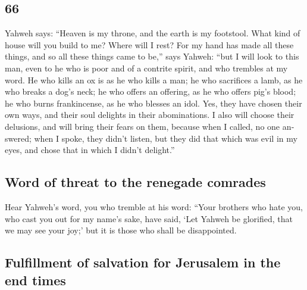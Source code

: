 \begin{paracol}{2}
\begin{otherlanguage}{english}
\hypertarget{section-131}{%
\section{66}\label{section-131}}

 Yahweh says: ``Heaven is my throne, and the earth is my
footstool. What kind of house will you build to me? Where will I rest?
 For my hand has made all these things, and so all these
things came to be,'' says Yahweh: ``but I will look to this man, even to
he who is poor and of a contrite spirit, and who trembles at my word.
 He who kills an ox is as he who kills a man; he who
sacrifices a lamb, as he who breaks a dog's neck; he who offers an
offering, as he who offers pig's blood; he who burns frankincense, as he
who blesses an idol. Yes, they have chosen their own ways, and their
soul delights in their abominations.  I also will choose
their delusions, and will bring their fears on them, because when I
called, no one answered; when I spoke, they didn't listen, but they did
that which was evil in my eyes, and chose that in which I didn't
delight.''

\hypertarget{word-of-threat-to-the-renegade-comrades}{%
\subsection{Word of threat to the renegade
comrades}\label{word-of-threat-to-the-renegade-comrades}}

 Hear Yahweh's word, you who tremble at his word: ``Your
brothers who hate you, who cast you out for my name's sake, have said,
`Let Yahweh be glorified, that we may see your joy;' but it is those who
shall be disappointed.

\hypertarget{fulfillment-of-salvation-for-jerusalem-in-the-end-times}{%
\subsection{Fulfillment of salvation for Jerusalem in the end
times}\label{fulfillment-of-salvation-for-jerusalem-in-the-end-times}}


\end{otherlanguage}
\end{paracol}
